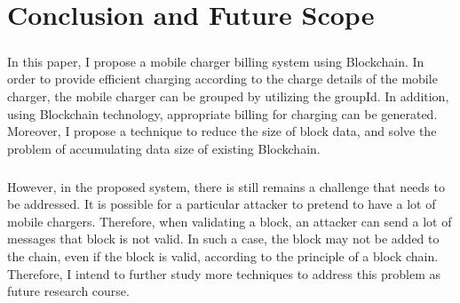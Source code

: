
\chapter{Conclusion and Future Scope}
\paragraph{}
In this paper, I propose a mobile charger billing system
using Blockchain. In order to provide efficient charging
according to the charge details of the mobile charger, the
mobile charger can be grouped by utilizing the groupId. In
addition, using Blockchain technology, appropriate billing for
charging can be generated. Moreover, I propose a technique
to reduce the size of block data, and solve the problem of
accumulating data size of existing Blockchain.
\paragraph{}
However, in the proposed system, there is still remains a
challenge that needs to be addressed. It is possible for a
particular attacker to pretend to have a lot of mobile chargers.
Therefore, when validating a block, an attacker can send a lot
of messages that block is not valid. In such a case, the block
may not be added to the chain, even if the block is valid,
according to the principle of a block chain. Therefore, I
intend to further study more techniques to address this problem
as future research course.
